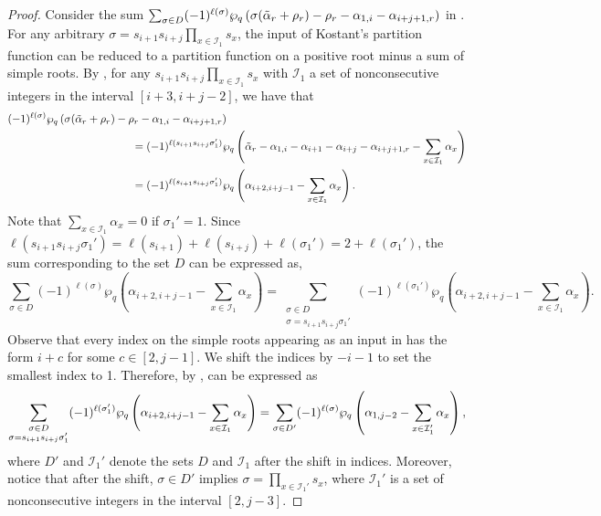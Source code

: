 \documentclass[10pt]{article}
\newcommand{\hr}[0]{\Tilde{\alpha}}
\newcommand{\qpartition}[1]{\wp_q\left(#1\right)}
\begin{document}
\begin{proof}
    Consider the sum $\sum_{\sigma\in D}(-1)^{\ell(\sigma)}\qpartition{\sigma(\hr_r+\rho_r)-\rho_r-\alpha_{1,i}-\alpha_{i+j+1,r}}$ in .  
    For any arbitrary $\sigma=s_{i+1}s_{i+j}\prod_{x\in\mathcal{I}_1}s_x$, the input of Kostant's partition function can be reduced to a partition function on a positive root minus a sum of simple roots. By , for any $s_{i+1}s_{i+j}\prod_{x\in\mathcal{I}_1}s_x$ with $\mathcal{I}_1$ a set of nonconsecutive integers in the interval $[i+3,i+j-2]$, we have that
    \begin{align}
        &(-1)^{\ell(\sigma)}\qpartition{\sigma(\hr_r+\rho_r)-\rho_r-\alpha_{1,i}-\alpha_{i+j+1,r}} \notag\\
        &\hspace{4cm}= (-1)^{\ell(s_{i+1}s_{i+j}\sigma_1')}\qpartition{\hr_r-\alpha_{1,i}-\alpha_{i+1}-\alpha_{i+j}-\alpha_{i+j+1,r}-\sum_{x\in\mathcal{I}_1}\alpha_x} \notag\\
        &\hspace{4cm}= (-1)^{\ell(s_{i+1}s_{i+j}\sigma_1')}\qpartition{\alpha_{i+2,i+j-1}-\sum_{x\in\mathcal{I}_1}\alpha_x}.\notag
    \end{align}
    Note that $\sum_{x\in\mathcal{I}_1}\alpha_x=0$ if $\sigma_1'=1$.
    Since $\ell(s_{i+1}s_{i+j}\sigma_1')=\ell(s_{i+1})+\ell(s_{i+j}) + \ell(\sigma_1')=2+\ell(\sigma_1')$, the sum corresponding to the set $D$ can be expressed as,
    \begin{equation}
         \sum_{\sigma\in D} (-1)^{\ell(\sigma)}\qpartition{\alpha_{i+2,i+j-1}-\sum_{x\in\mathcal{I}_1}\alpha_x} = \sum_{\substack{\sigma\in D \\ \sigma=s_{i+1}s_{i+j}\sigma_1'}}(-1)^{\ell(\sigma_1')}\qpartition{\alpha_{i+2,i+j-1}-\sum_{x\in\mathcal{I}_1}\alpha_x}.\label{D'} 
    \end{equation}
    Observe that every index on the simple roots appearing as an input in  has the form $i+c$ for some $c\in[2,j-1]$. We shift the indices by $-i-1$ to set the smallest index to 1. Therefore, by ,  can be expressed as
    \begin{equation}
        \sum_{\substack{\sigma\in D \\ \sigma=s_{i+1}s_{i+j}\sigma_1'}} (-1)^{\ell(\sigma_1')}\qpartition{\alpha_{i+2,i+j-1}-\sum_{x\in\mathcal{I}_1}\alpha_x} = \sum_{\sigma\in D'}(-1)^{\ell(\sigma)}\qpartition{\alpha_{1,j-2}-\sum_{x\in\mathcal{I}'_1}\alpha_x},\notag
    \end{equation}
    where $D'$ and $\mathcal{I}_1'$ denote the sets $D$ and $\mathcal{I}_1$ after the shift in indices. Moreover, notice that after the shift, $\sigma\in D'$ implies $\sigma=\prod_{x\in\mathcal{I}_1'}s_x$, where $\mathcal{I}_1'$ is a set of nonconsecutive integers in the interval $[2,j-3]$.


\end{proof}
\end{document}
